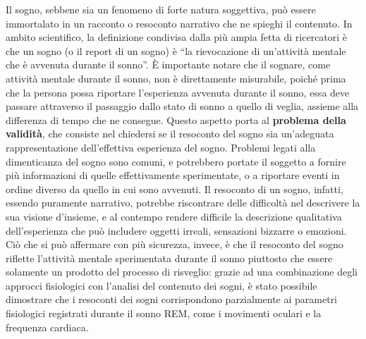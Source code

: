 Il sogno, sebbene sia un fenomeno di forte natura soggettiva, può essere immortalato in un racconto o resoconto
narrativo che ne spieghi il contenuto.
In ambito scientifico, la definizione condivisa dalla più ampia fetta di ricercatori è che un sogno
(o il report di un sogno) è ``la rievocazione di un'attività mentale che è avvenuta durante il sonno''.
\`E importante notare che il sognare, come attività mentale durante il sonno, non è direttamente misurabile,
poiché prima che la persona possa riportare l'esperienza avvenuta durante il sonno, essa
deve passare attraverso il passaggio dallo stato di sonno a quello di veglia, assieme alla differenza di tempo
che ne consegue.
Questo aspetto porta al \textbf{problema della validità}, che consiste nel chiedersi se il resoconto del sogno sia
un'adeguata rappresentazione dell'effettiva esperienza del sogno.
Problemi legati alla dimenticanza del sogno sono comuni, e potrebbero portate il soggetto a fornire più informazioni
di quelle effettivamente sperimentate, o a riportare eventi in ordine diverso da quello in cui sono avvenuti.
Il resoconto di un sogno, infatti, essendo puramente narrativo, potrebbe riscontrare delle difficoltà nel
descrivere la sua visione d'insieme, e al contempo rendere difficile la descrizione qualitativa dell'esperienza
che può includere oggetti irreali, sensazioni bizzarre o emozioni.
Ciò che si può affermare con più sicurezza, invece, è che il resoconto del sogno riflette l'attività mentale
sperimentata durante il sonno piuttosto che essere solamente un prodotto del processo di risveglio: grazie ad una
combinazione degli approcci fisiologici con l'analisi del contenuto dei sogni, è stato possibile dimostrare che i
resoconti dei sogni corrispondono parzialmente ai parametri fisiologici registrati durante il sonno REM, come i
movimenti oculari e la frequenza cardiaca. \newline

